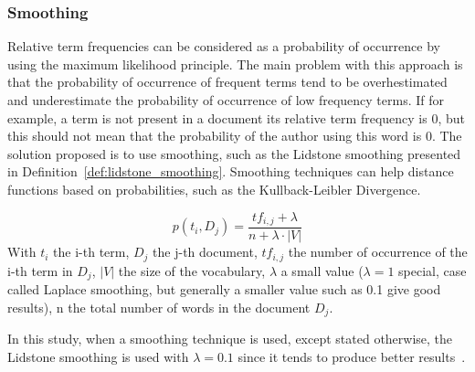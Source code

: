 \subsubsection{Smoothing}

Relative term frequencies can be considered as a probability of occurrence by using the maximum likelihood principle.
The main problem with this approach is that the probability of occurrence of frequent terms tend to be overhestimated and underestimate the probability of occurrence of low frequency terms.
If for example, a term is not present in a document its relative term frequency is 0, but this should not mean that the probability of the author using this word is 0.
The solution proposed is to use smoothing, such as the Lidstone smoothing presented in Definition~\ref{def:lidstone_smoothing}.
Smoothing techniques can help distance functions based on probabilities, such as the Kullback-Leibler Divergence.~\cite{savoy_stylo}

\begin{definition}
  \label{def:lidstone_smoothing}
  \begin{equation}
    p(t_i, D_j) = \frac{tf_{i,j} + \lambda}{n + \lambda \cdot |V|}
  \end{equation}
  With $t_i$ the i-th term, $D_j$ the j-th document, $tf_{i,j}$ the number of occurrence of the i-th term in $D_j$, $|V|$ the size of the vocabulary, $\lambda$ a small value ($\lambda = 1$ special, case called Laplace smoothing, but generally a smaller value such as 0.1 give good results), n the total number of words in the document $D_j$.
\end{definition}

In this study, when a smoothing technique is used, except stated otherwise, the Lidstone smoothing is used with $\lambda = 0.1$ since it tends to produce better results~\cite{savoy_stylo}.
